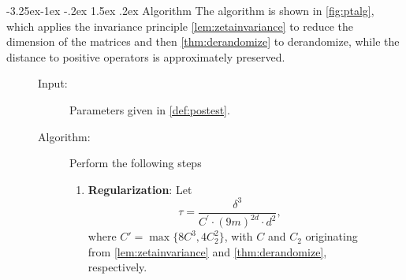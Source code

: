 \documentclass[11pt]{article}
\makeatletter
\renewcommand{\subsection}{\@startsection{subsection}{2}{\z@}%
             {-3.25ex\@plus -1ex \@minus -.2ex}%
             {1.5ex \@plus .2ex}%
             {\normalfont\large\scshape\bfseries}}
\theoremstyle{plain}
\theoremstyle{definition}
\newenvironment{Algorithm}{\begin{framed}}{\end{framed}}
\newcommand{\dldd} {\ensuremath{{d}}}
\newcommand{\1}{\mathbb{1}} %
\makeatother
\begin{document}
\subsection{Algorithm}
The algorithm is shown in \cref{fig:ptalg}, which applies the invariance principle \cref{lem:zetainvariance} to reduce the dimension of the matrices and then \cref{thm:derandomize} to derandomize, while the distance to positive operators is approximately preserved.
\begin{figure}
\begin{Algorithm}
\begin{description}
    \item[Input:] Parameters given in \cref{def:postest}.
    \item[Algorithm:] Perform the following steps
    
        \begin{enumerate}
          \item \textbf{Regularization}: 
            Let
            \begin{equation}\label{eq:chooseoftau}
                \tau = \frac{\delta^3}{C^\prime\cdot(9m)^{2\dldd}\cdot\dldd^2},
            \end{equation}
            where $C'=\max\{8C^3,4C_2^2\}$, with $C$ and $C_2$ originating from \cref{lem:zetainvariance} and \cref{thm:derandomize}, respectively. 
            

\end{enumerate}
\end{description}
\end{Algorithm}
\end{figure}
\end{document}
